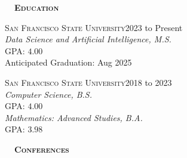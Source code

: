 \documentclass[hidelinks, 10pt]{article}
\def\contentwidth{0.9\linewidth}    %
\def\contentblockspacing{2.5mm}     %
\def\sectionspacing{8mm}            %
\def\sectiontocontentspacing{4mm}   %
\renewcommand{\section}[1]{
    {\fontsize{14}{14}\selectfont \textsc{\textbf{\ \ #1\ \ }}}\hrulefill
}
\begin{document}
{\centering
\vspace{\contentblockspacing}

\section{Education}

\vspace{\sectiontocontentspacing}

\begin{minipage}[ct]{0.9\linewidth}
    {\textsc{San Francisco State University}}\hfill 2023 to Present\\
    \emph{Data Science and Artificial Intelligence, M.S.}\\
    {\small GPA: $4.00$}\\
    Anticipated Graduation: Aug 2025
\end{minipage}

\vspace{\contentblockspacing}

\begin{minipage}[ct]{\contentwidth}
    {\textsc{San Francisco State University}}\hfill 2018 to 2023\\
    \emph{Computer Science, B.S.}\\
    {\small GPA: $4.00$}\\
    \emph{Mathematics: Advanced Studies, B.A.}\\
    {\small GPA: $3.98$}
\end{minipage}



\vspace{\sectionspacing}


\section{Conferences}

\vspace{\sectiontocontentspacing}

}
\end{document}
